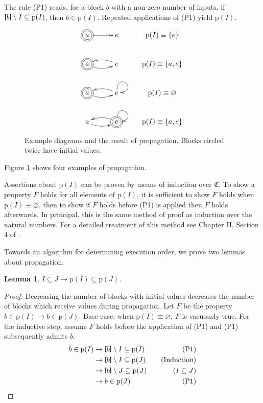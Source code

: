 \documentclass[twocolumn]{article}
\newtheorem{lemma}{Lemma}
\newcommand{\TightBracketB}[1]{\raisebox{0.25ex}{\scalebox{0.8}{\boldmath${#1\kern-0.65ex#1}$}}}%
\newcommand*{\Inputs}[1]{\TightBracketB[#1\TightBracketB]}
\begin{document}
The rule (P1) reads, for a block $b$ with a non-zero number of inputs, if $\Inputs{b}\setminus I \subseteq \text{p}(I)$, then $b\in \text{p}(I)$. Repeated applications of (P1) yield $\text{p}(I)$.

\begin{figure}[h]
\[
    \xymatrix{
    *++[o][F=]{a} \ar[r] & e & \text{p}(I)\equiv \{e\} \\
    *++[o][F=]{a} \ar@/_/[r] & e \ar@/_/[l] & \text{p}(I)\equiv \{a, e\} \\
    *++[o][F=]{a} \ar@/_/[r] & e \ar@(u, r)[] \ar@/_/[l] & \text{p}(I)\equiv \varnothing \\
    a \ar@/_/[r] & *++[o][F=]{e} \ar@(u, r)[] \ar@/_/[l] & \text{p}(I)\equiv \{a, e\} \\
    }
\]
    \caption{Example diagrams and the result of propagation. Blocks circled twice have initial values.}
    \label{fig:pexamples}
\end{figure}

Figure \ref{fig:pexamples} shows four examples of propagation.

Assertions about $\text{p}(I)$ can be proven by means of induction over $\mathfrak{C}$. To show a property $F$ holds for all elements of $\text{p}(I)$, it is sufficient to show $F$ holds when $\text{p}(I)\equiv \varnothing$, then to show if $F$ holds before (P1) is applied then $F$ holds afterwards. In principal, this is the same method of proof as induction over the natural numbers. For a detailed treatment of this method see Chapter II, Section 4 of \cite{Ebbinghaus-Flum-Thomas}.

Towards an algorithm for determining execution order, we prove two lemmas about propagation.

\begin{lemma}\label{lem:subset}
$I\subseteq J \rightarrow \text{p}(I)\subseteq\text{p}(J)$.
\end{lemma}
\begin{proof}
    Decreasing the number of blocks with initial values decreases the number of blocks which receive values during propagation. Let $F$ be the property $b\in \text{p}(I)\rightarrow b\in\text{p}(J)$. Base case, when $\text{p}(I)\equiv\varnothing$, $F$ is vacuously true. For the inductive step, assume $F$ holds before the application of (P1) and (P1) subsequently admits $b$.
\begin{align*}
    b \in \text{p}(I) &\rightarrow \Inputs{b} \setminus I \subseteq \text{p}(I)\quad &(\text{P1})\\
    &\rightarrow \Inputs{b} \setminus I \subseteq \text{p}(J) \quad &(\text{Induction}) \\
    &\rightarrow \Inputs{b} \setminus J \subseteq \text{p}(J) \quad &(I \subseteq J) \\
    &\rightarrow b\in\text{p}(J)\quad &\text{(P1)} \\
\end{align*}
\end{proof}
\end{document}
